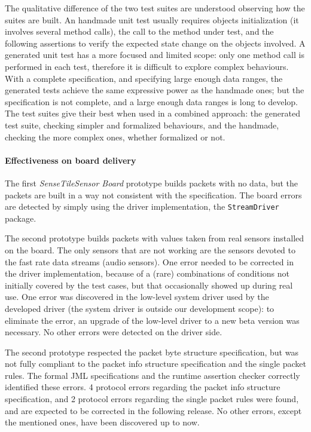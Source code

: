 \documentclass[english]{lni}
\newcommand{\lil}[1]{\texttt{\lstinline|#1|}}
\newcommand{\ST}{\emph{SenseTile}\xspace}
\newcommand{\SB}{\emph{Sensor Board}\xspace}
\newcommand{\STSB}{\ST \SB\xspace}
\begin{document}
The qualitative difference of the two test suites are understood observing how the suites are built. 
An handmade unit test usually requires objects initialization (it involves several method calls), the call to the method under test, and the following assertions to verify the expected state change on the objects involved. 
A generated unit test has a more focused and limited scope: only one method call is performed in each test, therefore it is difficult to explore complex behaviours. 
With a complete specification, and specifying large enough data ranges, the generated tests achieve the same expressive power as the handmade ones; but the specification is not complete, and a large enough data ranges is long to develop.
The test suites give their best when used in a combined approach: the generated test suite, checking simpler and formalized behaviours, and the handmade, checking the more complex ones, whether formalized or not.  



\paragraph*{Effectiveness on board delivery}

The first \STSB prototype builds packets with no data, but the packets are built in a way not consistent with the specification.  
The board errors are detected by simply using the driver implementation, the \lil{StreamDriver} package.

The second prototype builds packets with values taken from real sensors installed on the board.  
The only sensors that are not working are the sensors devoted to the fast rate data streams (audio sensors).  
One error needed to be corrected in the driver implementation, because of a (rare) combinations of conditions not initially covered by the test cases, but that occasionally showed up during real use.
One error was discovered in the low-level system driver used by the developed driver (the system driver is outside our development scope): to eliminate the error, an upgrade of the low-level driver to a new beta version was necessary. 
No other errors were detected on the driver side.

The second prototype respected the packet byte structure specification, but was not fully compliant to the packet info structure specification and the single packet rules.
The formal JML specifications and the runtime assertion checker correctly identified these errors.
4 protocol errors regarding the packet info structure specification, and 2 protocol errors regarding the single packet rules were found, and are expected to be corrected in the following release. 
No other errors, except the mentioned ones, have been discovered up to now.
\end{document}
